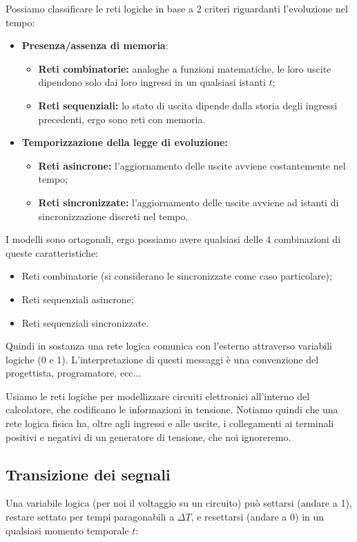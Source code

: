\documentclass[a4paper,11pt]{article}
\begin{document}
Possiamo classificare le reti logiche in base a 2 criteri riguardanti l'evoluzione nel tempo:
\begin{itemize}
	\item \textbf{Presenza/assenza di memoria}:
		\begin{itemize}
			\item \textbf{Reti combinatorie:} analoghe a funzioni matematiche, le loro uscite dipendono solo dai loro ingressi in un qualsiasi istanti $t$;
			\item \textbf{Reti sequenziali:} lo stato di uscita dipende dalla storia degli ingressi precedenti, ergo sono reti con memoria.
		\end{itemize}
	\item \textbf{Temporizzazione della legge di evoluzione:}
		\begin{itemize}
			\item \textbf{Reti asincrone:} l'aggiornamento delle uscite avviene costantemente nel tempo;
			\item \textbf{Reti sincronizzate:} l'aggiornamento delle uscite avviene ad istanti di sincronizzazione discreti nel tempo.
		\end{itemize}
\end{itemize}

I modelli sono ortogonali, ergo possiamo avere qualsiasi delle 4 combinazioni di queste caratteristiche:
\begin{itemize}
	\item Reti combinatorie (si considerano le sincronizzate come caso particolare);
	\item Reti sequenziali asincrone;
	\item Reti sequenziali sincronizzate.
\end{itemize}

Quindi in sostanza una rete logica comunica con l'esterno attraverso variabili logiche (0 e 1).
L'interpretazione di questi messaggi è una convenzione del progettista, programatore, ecc...

Usiamo le reti logiche per modellizzare circuiti elettronici all'interno del calcolatore, che codificano le informazioni in tensione.
Notiamo quindi che una rete logica fisica ha, oltre agli ingressi e alle uscite, i collegamenti ai terminali positivi e negativi di un generatore di tensione, che noi ignoreremo. 

\subsection{Transizione dei segnali}
Una variabile logica (per noi il voltaggio su un circuito) può settarsi (andare a 1), restare settato per tempi paragonabili a $\Delta T$, e resettarsi (andare a 0) in un qualsiasi momento temporale $t$:
\end{document}

